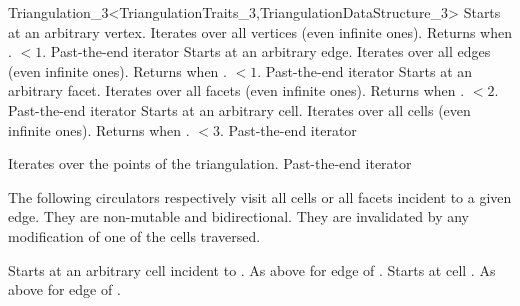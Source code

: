 \begin{ccRefClass}{Triangulation_3<TriangulationTraits_3,TriangulationDataStructure_3>}
{Starts at an arbitrary vertex. Iterates over all vertices (even infinite
ones). Returns  when
\ccVar. $<1$.}  
\ccGlue
{}
{Past-the-end iterator}
\ccGlue
{}
{Starts at an arbitrary edge. Iterates over all edges (even infinite
ones). Returns  when \ccVar. $<1$.}
\ccGlue
{}
{Past-the-end iterator}
\ccGlue
{}
{Starts at an arbitrary facet. Iterates over all facets (even infinite
ones). Returns  when 
\ccVar. $<2$.}
\ccGlue
{}
{Past-the-end iterator}
\ccGlue
{}
{Starts at an arbitrary cell. Iterates over all cells (even infinite
ones). Returns  when 
\ccVar. $<3$.}
\ccGlue
{}
{Past-the-end iterator}

{Iterates over the points of the triangulation.}
\ccGlue
{}
{Past-the-end iterator}


The following circulators respectively visit all cells or all facets
incident to a given edge. They are non-mutable and bidirectional. They
are invalidated by any modification of one of the cells traversed. 

{Starts at an arbitrary cell incident to .
}
\ccGlue
{}
{As above for edge  of .}
\ccGlue
{}
{Starts at cell .
}
\ccGlue
{}
{As above for edge  of .}


\end{ccRefClass}
